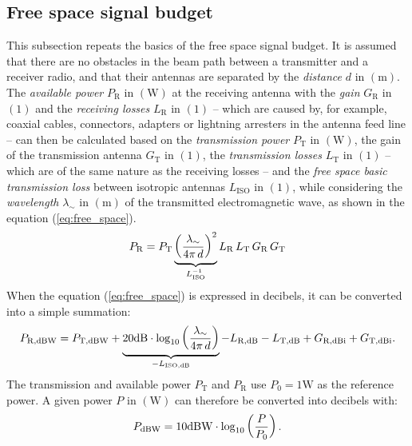 \subsection{Free space signal budget}
This subsection repeats the basics of the free space signal budget. It is assumed that there are no obstacles in the beam path between a transmitter and a receiver radio, and that their antennas are separated by the \emph{distance} $d$ in $\left(\mathrm{m}\right)$. The \emph{available power} $P_\mathrm{R}$ in $\left(\mathrm{W}\right)$ at the receiving antenna with the \emph{gain} $G_\mathrm{R}$ in $\left(\mathrm{1}\right)$ and the \emph{receiving losses} $L_\mathrm{R}$ in $\left(\mathrm{1}\right)$ -- which are caused by, for example, coaxial cables, connectors, adapters or lightning arresters in the antenna feed line -- can then be calculated based on the \emph{transmission power} $P_\mathrm{T}$ in $\left(\mathrm{W}\right)$, the gain of the transmission antenna $G_\mathrm{T}$ in $\left(\mathrm{1}\right)$, the \emph{transmission losses} $L_\mathrm{T}$ in $\left(\mathrm{1}\right)$ -- which are of the same nature as the receiving losses -- and the \emph{free space basic transmission loss} between isotropic antennas $L_\mathrm{ISO}$ in $\left(\mathrm{1}\right)$, while considering the \emph{wavelength} $\lambda_\sim$ in $\left(\mathrm{m}\right)$ of the transmitted electromagnetic wave, as shown in the equation (\ref{eq:free_space}).
\begin{equation} \label{eq:free_space}
	\centering
	P_\mathrm{R} = P_\mathrm{T} \underbrace{\left(\dfrac{\lambda_\sim}{4 \pi \, d}\right)^2}_{L_\mathrm{ISO}^{-1}} L_\mathrm{R} \, L_\mathrm{T} \, G_\mathrm{R} \, G_\mathrm{T}
\end{equation}
When the equation (\ref{eq:free_space}) is expressed in decibels, it can be converted into a simple summation:
\begin{equation} \label{eq:free_space_dB}
	\centering
	P_\mathrm{R,dBW} = P_\mathrm{T,dBW} + \underbrace{20\mathrm{dB} \cdot \log_{10} \left(\dfrac{\lambda_\sim}{4 \pi \, d}\right)}_{- L_\mathrm{ISO,dB}} - L_\mathrm{R,dB} - L_\mathrm{T,dB} + G_\mathrm{R,dBi} + G_\mathrm{T,dBi}\text{.}
\end{equation}
The transmission and available power $P_\mathrm{T}$ and $P_\mathrm{R}$ use $P_0 = 1\mathrm{W}$ as the reference power. A given power $P$ in $\left(\mathrm{W}\right)$ can therefore be converted into decibels with:
\begin{equation} \label{eq:p_dBW_calc}
	\centering
	P_\mathrm{dBW} = 10\mathrm{dBW} \cdot \log_{10} \left(\dfrac{P}{P_0}\right)\text{.}
\end{equation}
